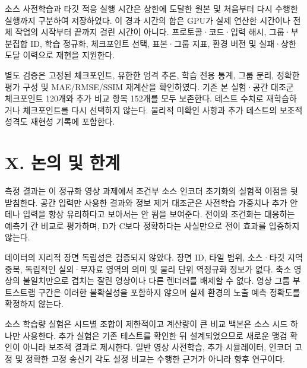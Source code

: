 \documentclass[10pt,a4paper]{article}
\begin{document}
소스 사전학습과 타깃 적응 실행 시간은 상한에 도달한 원본 및 처음부터 다시 수행한 실행까지 구분하여 저장하였다. 이 경과 시간의 합은 GPU가 실제 연산한 시간이나 전체 작업의 시작부터 끝까지 걸린 시간이 아니다. 프로토콜·코드·입력 해시, 그룹·부분집합 ID, 학습 정규화, 체크포인트 선택, 표본·그룹 지표, 환경 버전 및 실패·상한 도달 이력으로 재현을 지원한다.

별도 검증은 고정된 체크포인트, 유한한 엄격 추론, 학습 전용 통계, 그룹 분리, 정확한 평가 구성 및 MAE/RMSE/SSIM 재계산을 확인하였다. 기존 본 실험·공간 대조군 체크포인트 120개와 추가 비교 항목 152개를 모두 보존한다. 테스트 수치로 재학습하거나 체크포인트를 다시 선택하지 않는다. 물리적 미확인 사항과 추가 테스트의 보조적 성격도 재현성 기록에 포함한다.

\begin{table}[htbp]\centering\small
\caption{표 8}
\end{table}
\section*{X. 논의 및 한계}
측정 결과는 이 정규화 영상 과제에서 조건부 소스 인코더 초기화의 실험적 이점을 뒷받침한다. 공간 입력만 사용한 결과와 정보 제거 대조군은 사전학습 가중치나 추가 안테나 입력을 항상 유리하다고 보아서는 안 됨을 보여준다. 전이와 조건화는 대응하는 예측기 간 비교로 평가하며, D가 C보다 정확하다는 사실만으로 전이 효과를 입증하지 않는다.

데이터의 지리적 장면 독립성은 검증되지 않았다. 장면 ID, 타일 범위, 소스·타깃 지역 중복, 독립적인 실외·무자료 영역의 의미 및 물리 단위 역정규화 정보가 없다. 축소 영상의 불일치만으로 겹치는 잘린 영상이나 다른 렌더러를 배제할 수 없다. 영상 그룹 부트스트랩 구간은 이러한 불확실성을 포함하지 않으며 실제 환경의 노출 예측 정확도를 확정하지 않는다.

소스 학습량 실험은 시드별 조합이 제한적이고 계산량이 큰 비교 백본은 소스 시드 하나만 사용한다. 추가 실험은 기존 테스트를 확인한 뒤 설계되었으므로 새로운 맹검 확인이 아니라 보조적 결과로 제시한다. 일반 영상 사전학습, 추가 시뮬레이터, 인코더 고정 및 정확한 고정 송신기 각도 설정 비교는 수행한 근거가 아니라 향후 연구이다.
\end{document}
